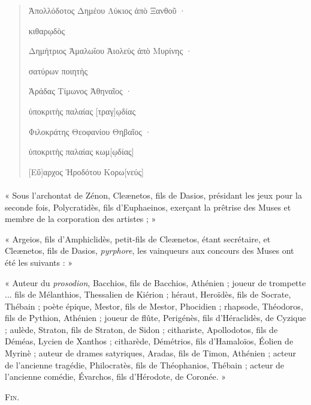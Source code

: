 \documentclass[a4paper, 11pt, oneside, polutonikogreek, french]{article}
\begin{document}
\begin{quotation}
Ἀπολλόδοτος Δημέου Λύκιος ἀπὸ Ξανθοῦ ·

\hspace*{5mm}κιθαρῳδὸς

Δημήτριος Ἁμαλωΐου Ἀιολεὺς ἀπὸ Μυρίνης ·

\hspace*{5mm}σατύρων ποιητὴς

Ἀράδας Τίμωνος Ἀθηναῖος ·

\hspace*{5mm}ὑποκριτὴς παλαίας [τραγ]ῳδίας

Φιλοκράτης Θεοφανίου Θηβαῖος ·

\hspace*{5mm}ὑποκριτὴς παλαίας κωμ[ῳδίας]

[Εὔ]αρχος Ἡροδότου Κορω[νεύς]
\end{quotation}
\paragraph{}
« Sous l'archontat de Zénon, Cleænetos, fils de Dasios, présidant les jeux pour la seconde fois, Polycratidès, fils d'Euphaeinos, exerçant la prêtrise des Muses et membre de la corporation des artistes ; »

« Argeios, fils d'Amphiclidès, petit-fils de Cleænetos, étant secrétaire, et Cleænetos, fils de Dasios, \emph{pyrphore}, les vainqueurs aux concours des Muses ont été les suivants : »

« Auteur du \emph{prosodion}, Bacchios, fils de Bacchios, Athénien ; joueur de trompette ... fils de Mélanthios, Thessalien de Kiérion ; héraut, Heroïdès, fils de Socrate, Thébain ; poète épique, Mestor, fils de Mestor, Phocidien ; rhapsode, Théodoros, fils de Pythion, Athénien ; joueur de flûte, Perigénès, fils d'Héraclidès, de Cyzique ; aulède, Straton, fils de Straton, de Sidon ; cithariste, Apollodotos, fils de Déméas, Lycien de Xanthos ; citharède, Démétrios, fils d'Hamaloïos, Éolien de Myrinè ; auteur de drames satyriques, Aradas, fils de Timon, Athénien ; acteur de l'ancienne tragédie, Philocratès, fils de Théophanios, Thébain ; acteur de l'ancienne comédie, Évarchos, fils d'Hérodote, de Coronée. »

\bigskip

\begin{center}
\textsc{Fin.}
\end{center}
\end{document}
